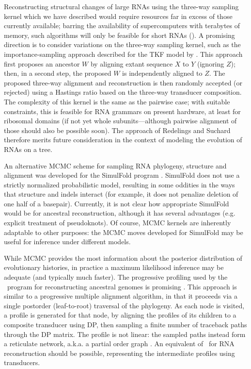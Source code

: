 \documentclass[10pt]{article}
\begin{document}

Reconstructing structural changes of large RNAs
using the three-way sampling kernel which we have described
would require resources far in excess of those currently available;
barring the availability of supercomputers with terabytes of memory,
such algorithms will only be feasible for short RNAs ().
A promising direction is to consider variations on the three-way sampling kernel,
such as the importance-sampling approach described for the TKF model
by \cite{RedelingsSuchard2005}.
This approach first proposes an ancestor $W$ by aligning extant
sequence $X$ to $Y$ (ignoring $Z$); then, in a second step, the proposed $W$ is
independently aligned to $Z$. The proposed three-way alignment and
reconstruction is then randomly accepted (or rejected) using a
Hastings ratio based on the three-way transducer composition. The
complexity of this kernel is the same as the pairwise case;
with suitable constraints, this is feasible for RNA
grammars on present hardware, at least for ribosomal domains (if not
yet whole subunits---although pairwise alignment of those should also
be possible soon). The approach of Redelings and Suchard therefore
merits future consideration in the context of modeling the evolution
of RNAs on a tree.

An alternative MCMC scheme for sampling RNA phylogeny, structure and alignment was developed for the SimulFold program \cite{MeyerMiklos2007}.
SimulFold does not use a strictly normalized probabilistic model, resulting in some oddities in the ways that structure and indels interact
(for example, it does not penalize deletion of one half of a basepair).
Currently, it is not clear how appropriate SimulFold would be for ancestral reconstruction,
although it has several advantages (e.g. explicit treatment of pseudoknots).
Of course, MCMC kernels are inherently adaptable to other purposes: the MCMC moves developed for SimulFold may be useful for inference under different models.

While MCMC provides the most information about the posterior distribution of evolutionary histories,
in practice a maximum likelihood inference may be adequate (and typically much faster).
The progressive profiling used by the \ortheus\ program for
reconstructing ancestral genomes is promising \cite{PatenHolmesBirney2008}.
This approach is similar to a progressive multiple alignment algorithm, in that it proceeds via a single postorder (leaf-to-root) traversal of the phylogeny.
As each node is visited, a profile is generated for that node, by aligning the profiles of its children to a composite transducer using DP, then sampling a finite number of traceback paths through the DP matrix.
The profile is not linear: the sampled paths instead form a reticulate network, a.k.a. a partial order graph \cite{LeeGrassoSharlow2002}.
An equivalent of \ortheus\ for RNA reconstruction should be possible,
representing the intermediate profiles using transducers.
\end{document}
